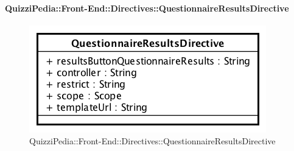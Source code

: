 \paragraph{QuizziPedia::Front-End::Directives::QuestionnaireResultsDirective}

\label{QuizziPedia::Front-End::Directives::QuestionnaireResultsDirective}

\begin{figure}[ht]
	\centering
	\includegraphics[scale=0.80,keepaspectratio]{UML/Classi/Front-End/QuizziPedia_Front-end_Directives_QuestionnaireResultsDirective.png}
	\caption{QuizziPedia::Front-End::Directives::QuestionnaireResultsDirective}
\end{figure} 
\FloatBarrier


